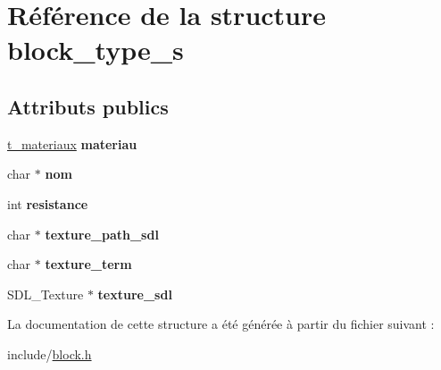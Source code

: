 \hypertarget{structblock__type__s}{}\section{Référence de la structure block\+\_\+type\+\_\+s}
\label{structblock__type__s}
\subsection*{Attributs publics}
\begin{DoxyCompactItemize}
\item 
\mbox{\label{structblock__type__s_a82611005fc1c350dc268ecfce3fdcb9a}} 
\hyperlink{block_8h_a4030ebe0eea609635f372f2e86d4332a}{t\+\_\+materiaux} {\bfseries materiau}
\item 
\mbox{\label{structblock__type__s_a24270b040acbfe41f41cd3a84ff75b3b}} 
char $\ast$ {\bfseries nom}
\item 
\mbox{\label{structblock__type__s_a71cd945de4cd58e1ab53bc0feb99acbc}} 
int {\bfseries resistance}
\item 
\mbox{\label{structblock__type__s_aa6d3c4bdb3ac3bd5972f4495870e2986}} 
char $\ast$ {\bfseries texture\+\_\+path\+\_\+sdl}
\item 
\mbox{\label{structblock__type__s_a0018e7e74b665cfb61fea3546fcb0d1a}} 
char $\ast$ {\bfseries texture\+\_\+term}
\item 
\mbox{\label{structblock__type__s_a16aca64b354d48a0f675743097d36b75}} 
S\+D\+L\+\_\+\+Texture $\ast$ {\bfseries texture\+\_\+sdl}
\end{DoxyCompactItemize}


La documentation de cette structure a été générée à partir du fichier suivant \+:\begin{DoxyCompactItemize}
\item 
include/\hyperlink{block_8h}{block.\+h}\end{DoxyCompactItemize}
